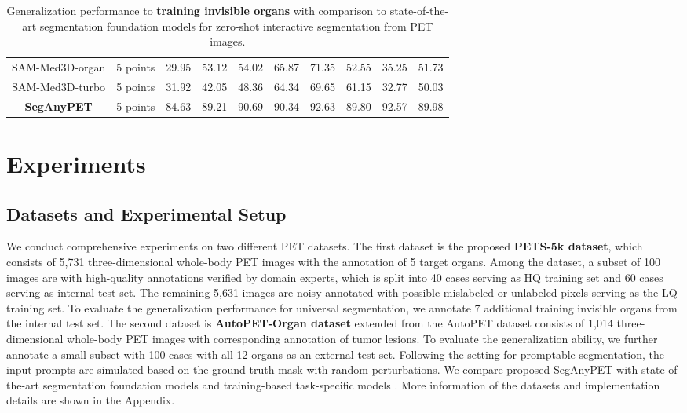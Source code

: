 \begin{table*}[t]
\begin{tabular}{c|c|ccccccc|c}
SAM-Med3D-organ & 5 points & 29.95 & 53.12 & 54.02 & 65.87 & 71.35 & 52.55 & 35.25 & 51.73 \\
SAM-Med3D-turbo & 5 points & 31.92 & 42.05 & 48.36 & 64.34 & 69.65 & 61.15 & 32.77 & 50.03 \\ \hline
\rowcolor{gray!25} \textbf{SegAnyPET}  & 5 points & 84.63 & 89.21 & 90.69 & 90.34 & 92.63 & 89.80 & 92.57 & 89.98 \\ \hline \hline
	\end{tabular}
 	\caption{Generalization performance to \textbf{\underline{training invisible organs}} with comparison to state-of-the-art segmentation foundation models for zero-shot interactive segmentation from PET images.} \label{Table_Unseen}
\end{table*}



\section{Experiments}

\subsection{Datasets and Experimental Setup}

We conduct comprehensive experiments on two different PET datasets.
The first dataset is the proposed \textbf{PETS-5k dataset}, which consists of 5,731 three-dimensional whole-body PET images with the annotation of 5 target organs.
Among the dataset, a subset of 100 images are with high-quality annotations verified by domain experts, which is split into 40 cases serving as HQ training set and 60 cases serving as internal test set.
The remaining 5,631 images are noisy-annotated with possible mislabeled or unlabeled pixels serving as the LQ training set.
To evaluate the generalization performance for universal segmentation, we annotate 7 additional training invisible organs from the internal test set.
The second dataset is \textbf{AutoPET-Organ dataset} extended from the AutoPET dataset  \cite{AutoPET} consists of 1,014 three-dimensional whole-body PET images with corresponding annotation of tumor lesions. To evaluate the generalization ability, we further annotate a small subset with 100 cases with all 12 organs as an external test set.
Following the setting for promptable segmentation, the input prompts are simulated based on the ground truth mask with random perturbations. We compare proposed SegAnyPET with state-of-the-art segmentation foundation models \cite{SAM,MedSAM,SAM-Med3D} and training-based task-specific models \cite{segresnet,isensee2020nnunet,hatamizadeh2021swin,huang2023stunet}. 
More information of the datasets and implementation details are shown in the Appendix.



